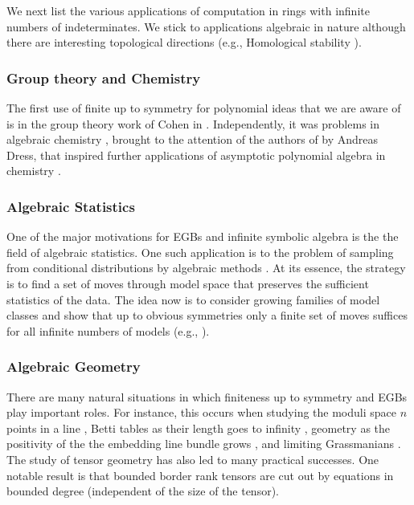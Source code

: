 We next list the various applications of computation in rings with infinite numbers of indeterminates.  
We stick to applications algebraic in nature although there are interesting topological directions (e.g., Homological stability \cite{randal2013homological, church2012homological}).


\subsubsection{Group theory and Chemistry}

The first use of finite up to symmetry for polynomial ideas that we are aware of is in the group theory work of Cohen in \cite{cohen1967laws}.  
Independently, it was problems in algebraic chemistry \cite{ruch1967vandermondesche}, brought to the attention of the authors of \cite{aschenbrenner2007finite} by Andreas Dress, that inspired further applications of asymptotic polynomial algebra in chemistry \cite{Draisma08b}.

\subsubsection{Algebraic Statistics}

One of the major motivations for EGBs and infinite symbolic algebra is the the field of algebraic statistics.  One such application is to the problem of sampling from conditional distributions by algebraic methods \cite{diaconis1998algebraic}.  At its essence, the strategy is to find a set of moves through model space that preserves the sufficient statistics of the data.   The idea now is to consider growing families of model classes and show that up to obvious symmetries only a finite set of moves suffices for all infinite numbers of models (e.g., \cite{aoki2003minimal, santos2003higher, hocsten2007finiteness, drton2007algebraic, Draisma08b, Brouwer09e, draisma2009ideals, hillar2012finite, draisma2015finiteness}).

\subsubsection{Algebraic Geometry}

There are many natural situations in which finiteness up to symmetry and EGBs play important roles.  For instance, this occurs when studying the moduli space $n$ points in a line \cite{howard2009equations}, Betti tables as their length goes to infinity \cite{ein2015asymptotics}, geometry as the positivity of the the embedding line bundle grows \cite{ein2012asymptotic}, and limiting Grassmanians \cite{draisma2015plucker}.  The study of tensor geometry has also led to many practical successes.  One notable result is that bounded border rank tensors are cut out by equations in bounded degree \cite{draisma2014bounded} (independent of the size of the tensor).

